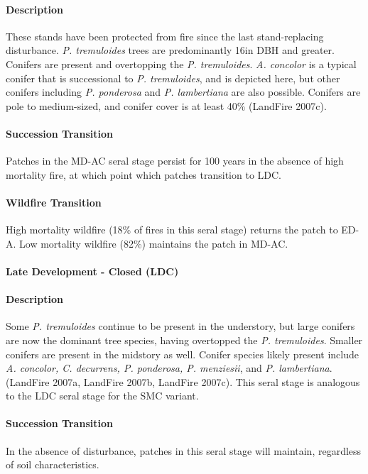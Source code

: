 \paragraph{Description} These stands have been protected from fire since the last stand-replacing disturbance. \emph{P. tremuloides} trees are predominantly 16in DBH and greater. Conifers are present and overtopping the \emph{P. tremuloides}. \emph{A. concolor} is a typical conifer that is successional to \emph{P. tremuloides}, and is depicted here, but other conifers including \emph{P. ponderosa} and \emph{P. lambertiana} are also possible. Conifers are pole to medium-sized, and conifer cover is at least 40\% (LandFire 2007c).

\paragraph{Succession Transition} Patches in the MD-AC seral stage persist for 100 years in the absence of high mortality fire, at which point which patches transition to LDC. 

\paragraph{Wildfire Transition} High mortality wildfire (18\% of fires in this seral stage) returns the patch to ED-A. Low mortality wildfire (82\%) maintains the patch in MD-AC.

\noindent\hrulefill

\paragraph{Late Development - Closed (LDC)}

\paragraph{Description} Some \emph{P. tremuloides} continue to be present in the understory, but large conifers are now the dominant tree species, having overtopped the \emph{P. tremuloides}. Smaller conifers are present in the midstory as well. Conifer species likely present include \emph{A. concolor, C. decurrens, P. ponderosa, P. menziesii}, and \emph{P. lambertiana}. (LandFire 2007a, LandFire 2007b, LandFire 2007c). This seral stage is analogous to the LDC seral stage for the SMC variant.

\paragraph{Succession Transition} In the absence of disturbance, patches in this seral stage will maintain, regardless of soil characteristics.

